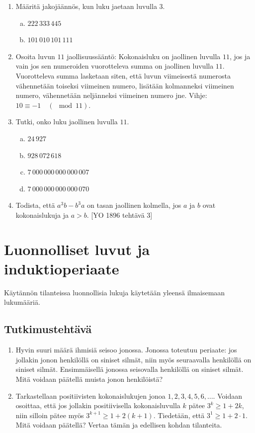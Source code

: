 \begin{enumerate}
\item
Määritä jakojäännös, kun luku jaetaan luvulla $3$.
\begin{enumerate}[a)]
\item $222\, 333\, 445$
\item $101\, 010\, 101\, 111$
\end{enumerate}

\item
Osoita luvun $11$ jaollisuussääntö: Kokonaisluku on jaollinen luvulla $11$, jos ja vain jos sen numeroiden vuorotteleva summa on jaollinen luvulla $11$. Vuorotteleva summa lasketaan siten, että luvun viimeisestä numerosta vähennetään toiseksi viimeinen numero, lisätään kolmanneksi viimeinen numero, vähennetään neljänneksi viimeinen numero jne. Vihje: $10\equiv -1\quad(\mod 11)$.

\item Tutki, onko luku jaollinen luvulla $11$.
\begin{enumerate}[a)]
\item $24\, 927$
\item $928\, 072\, 618$
\item $7\, 000\, 000\, 000\, 000\, 007$
\item $7\, 000\, 000\, 000\, 000\, 070$
\end{enumerate}

\item Todista, että $a^3b-b^3a$ on tasan jaollinen kolmella, jos $a$ ja $b$ ovat kokonaislukuja ja $a>b$. 
[YO 1896 tehtävä 3]

\end{enumerate}

\newpage

\section{Luonnolliset luvut ja induktioperiaate} %

\medskip

Käytännön tilanteissa luonnollisia lukuja käytetään yleensä ilmaisemaan lukumääriä. 

\subsection*{Tutkimustehtävä}
\begin{enumerate}
\item
Hyvin suuri määrä ihmisiä seisoo jonossa. Jonossa toteutuu periaate: jos jollakin jonon
henkilöllä on siniset silmät, niin myös seuraavalla henkilöllä on siniset silmät. Ensimmäisellä jonossa seisovalla henkilöllä on siniset silmät. Mitä voidaan päätellä muista jonon henkilöistä?
\item
Tarkastellaan positiivisten kokonaislukujen jonoa $1, 2, 3, 4, 5, 6,\ldots$. Voidaan osoittaa, että jos jollakin positiivisella kokonaisluvulla $k$ pätee $3^k \ge 1+2k$, niin silloin pätee myös $3^{k+1} \ge 1+2(k+1)$. Tiedetään, että $3^1 \ge 1 + 2 \cdot 1$. Mitä voidaan päätellä? Vertaa tämän ja edellisen kohdan tilanteita.
\end{enumerate}

